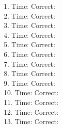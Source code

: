 \documentclass[12pt, letterpaper]{article}
\begin{document}
\begin{multicols}{2}
\setlength{\columnseprule}{0.5pt}
{
\noindent
\phantom{0}1. Time: \underline{\hspace{6em}}\quad Correct: \underline{\hspace{3em}}\\
\phantom{0}2. Time: \underline{\hspace{6em}}\quad Correct: \underline{\hspace{3em}}\\
\phantom{0}3. Time: \underline{\hspace{6em}}\quad Correct: \underline{\hspace{3em}}\\
\phantom{0}4. Time: \underline{\hspace{6em}}\quad Correct: \underline{\hspace{3em}}\\
\phantom{0}5. Time: \underline{\hspace{6em}}\quad Correct: \underline{\hspace{3em}}\\
\phantom{0}6. Time: \underline{\hspace{6em}}\quad Correct: \underline{\hspace{3em}}\\
\phantom{0}7. Time: \underline{\hspace{6em}}\quad Correct: \underline{\hspace{3em}}\\
\phantom{0}8. Time: \underline{\hspace{6em}}\quad Correct: \underline{\hspace{3em}}\\
\phantom{0}9. Time: \underline{\hspace{6em}}\quad Correct: \underline{\hspace{3em}}\\
10. Time: \underline{\hspace{6em}}\quad Correct: \underline{\hspace{3em}}\\
11. Time: \underline{\hspace{6em}}\quad Correct: \underline{\hspace{3em}}\\
12. Time: \underline{\hspace{6em}}\quad Correct: \underline{\hspace{3em}}\\
13. Time: \underline{\hspace{6em}}\quad Correct: \underline{\hspace{3em}}\\
}
\end{multicols}
\end{document}
